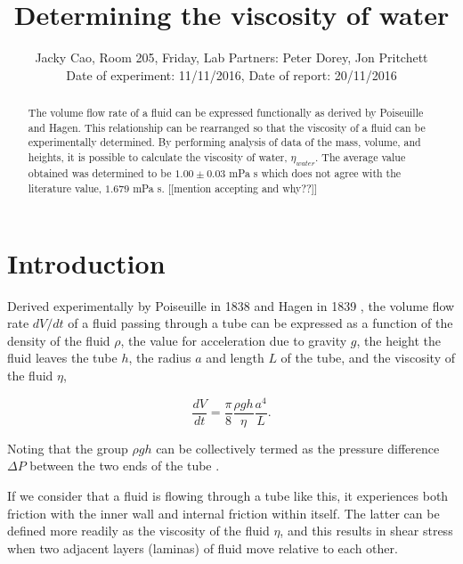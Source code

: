 \documentclass[twocolumn]{revtex4}
\newcommand{\squeezeup}{\vspace{-2.5mm}}
\begin{document}
\textheight=26.385cm

\title{Determining the viscosity of water} 
 
 
\author{Jacky Cao, Room 205, Friday, Lab Partners: Peter Dorey, Jon Pritchett \\ Date of experiment: 11/11/2016, Date of report: 20/11/2016}


\begin{abstract}              
 
The volume flow rate of a fluid can be expressed functionally as derived by Poiseuille and Hagen. This relationship can be rearranged so that the viscosity of a fluid can be experimentally determined. By performing analysis of data of the mass, volume, and heights, it is possible to calculate the viscosity of water, $\eta_{water}$. The average value obtained was determined to be $1.00 \pm 0.03$ mPa s which does not agree with the literature value, $1.679$ mPa s. [[mention accepting and why??]]

\end{abstract}

\maketitle

\section{Introduction} 
\vspace{-2ex} 

Derived experimentally by Poiseuille in 1838 and Hagen in 1839 \cite{poiseuillehagen}, the volume flow rate $dV/dt$ of a fluid passing through a tube can be expressed as a function of the density of the fluid $\rho$, the value for acceleration due to gravity $g$, the height the fluid leaves the tube $h$, the radius $a$ and length $L$ of the tube, and the viscosity of the fluid $\eta$,

\squeezeup

\begin{equation} 
\frac{dV}{dt}=\frac{\pi}{8}\frac{\rho gh}{\eta}\frac{a^4}{L}. 
\label{pohagen}
\end{equation}

Noting that the group $\rho gh$ can be collectively termed as the pressure difference $\Delta P$ between the two ends of the tube \cite{collegephysics}. 

If we consider that a fluid is flowing through a tube like this, it experiences both friction with the inner wall and internal friction within itself. The latter can be defined more readily as the viscosity of the fluid $\eta$, and this results in shear stress when two adjacent layers (laminas) of fluid move relative to each other. 
\end{document}
